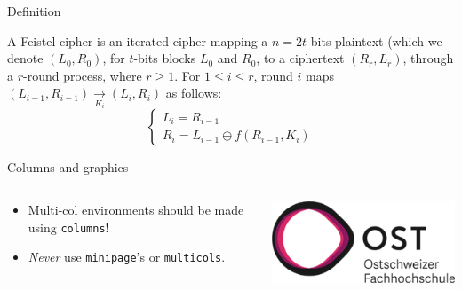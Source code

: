 \documentclass[aspectratio=169,envcountsect]{beamer}    %
\begin{document}
\begin{frame}{Definition}
	\begin{definition}
		A Feistel cipher is an iterated cipher mapping a $n = 2t$ bits plaintext (which we denote $(L_0,R_0)$, for $t$-bits blocks $L_0$ and $R_0$, to a ciphertext $(R_r,L_r)$, through a $r$-round process, where $r\geq 1$. For $1 \leq i \leq r$, round $i$ maps $(L_{i-1},R_{i-1}) \underset{K_i}{\rightarrow} (L_i,R_i)$ as follows:
		\[
			\left\{\begin{array}{l}
				L_i = R_{i-1}\\
				R_i = L_{i-1} \oplus f(R_{i-1},K_i)
			\end{array}\right.
		\]
	\end{definition}
\end{frame}
%
\begin{frame}{Columns and graphics}
    \begin{columns}[onlytextwidth]
        \begin{column}{0.5\textwidth}
            \begin{itemize}
                \item Multi-col environments should be made using \texttt{columns}!
                \item \emph{Never} use \texttt{minipage}'s or \texttt{multicols}.
            \end{itemize}
        \end{column}
        \begin{column}{0.5\textwidth}
            \centering
            \includegraphics[width=0.8\linewidth]{header/ost_logo}
        \end{column}
    \end{columns}
\end{frame}
\end{document}
